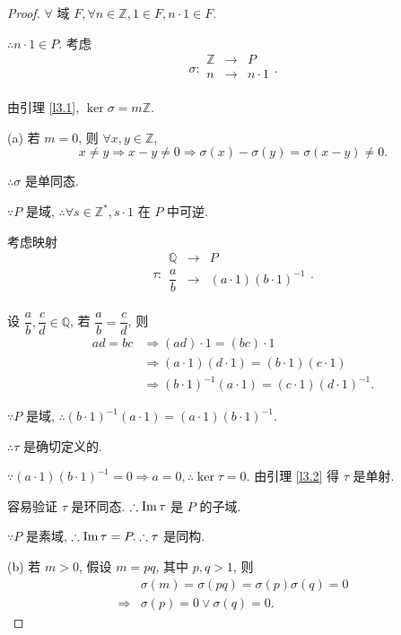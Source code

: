 \documentclass[color=black,device=normal,lang=cn,mode=geye]{elegantnote}
\begin{document}
\begin{proof}
    $\forall$ 域 $F,\forall n\in\mathbb{Z},1\in F,n\cdot1\in F$.

    $\therefore n\cdot1\in P$. 考虑
    \[\sigma:\begin{array}{rcl}
        \mathbb{Z} & \to & P \\
        n & \to & n\cdot1 \\
    \end{array}.\]

    由引理 \ref{l3.1}, $\ker\sigma=m\mathbb{Z}$.

    (a) 若 $m=0$, 则 $\forall x,y\in\mathbb{Z}$,
    \[x\neq y\Rightarrow x-y\neq0\Rightarrow\sigma (x)-\sigma(y)=\sigma(x-y)\neq0.\]

    $\therefore\sigma$ 是单同态.

    $\because P$ 是域, $\therefore\forall s\in \mathbb{Z}^*,s\cdot1$ 在 $P$ 中可逆.

    考虑映射
    \[\tau:\begin{array}{rcl}
        \mathbb{Q} & \to & P \\[6pt]
        \dfrac{a}{b} & \to & (a\cdot1)(b\cdot1)^{-1} \\
    \end{array}.\]

    设 $\dfrac{a}{b},\dfrac{c}{d}\in\mathbb{Q}$, 若 $\dfrac{a}{b}=\dfrac{c}{d}$, 则
    \begin{align*}
        ad=bc & \Rightarrow(ad)\cdot1=(bc)\cdot1 \\
        & \Rightarrow(a\cdot1)(d\cdot1)=(b\cdot1)(c\cdot1) \\
        & \Rightarrow(b\cdot1)^{-1}(a\cdot1)=(c\cdot1)(d\cdot1)^{-1}.
    \end{align*}

    $\because P$ 是域, $\therefore(b\cdot1)^{-1}(a\cdot1)=(a\cdot1)(b\cdot1)^{-1}$.

    $\therefore\tau$ 是确切定义的.

    $\because(a\cdot1)(b\cdot1)^{-1}=0\Rightarrow a=0,\therefore\ker\tau=0$. 由引理 \ref{l3.2} 得 $\tau$ 是单射.

    容易验证 $\tau$ 是环同态. $\therefore\operatorname{Im} \tau$ 是 $P$ 的子域.

    $\because P$ 是素域, $\therefore\operatorname{Im} \tau=P.\therefore\tau$ 是同构.

    (b) 若 $m>0$, 假设 $m=pq$, 其中 $p,q>1$, 则
    \begin{align*}
        & \sigma(m)=\sigma(pq)=\sigma(p)\sigma(q)=0 \\
        \Rightarrow & \sigma(p)=0\vee\sigma(q)=0.
    \end{align*}


\end{proof}
\end{document}
